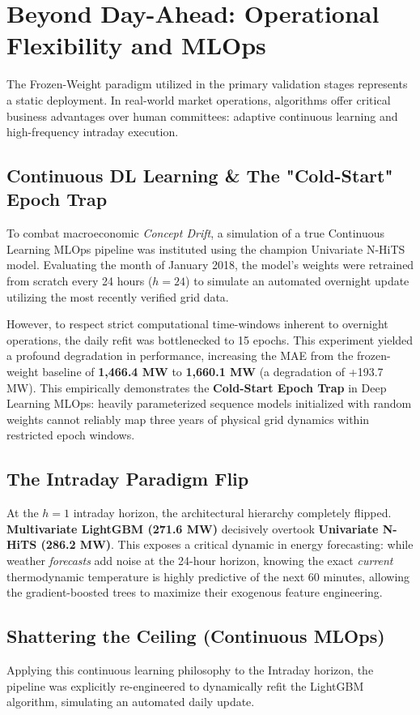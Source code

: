 \documentclass{article}
\begin{document}
\section{Beyond Day-Ahead: Operational Flexibility and MLOps}

The Frozen-Weight paradigm utilized in the primary validation stages represents a static deployment. In real-world market operations, algorithms offer critical business advantages over human committees: adaptive continuous learning and high-frequency intraday execution.

\subsection*{Continuous DL Learning \& The "Cold-Start" Epoch Trap}
To combat macroeconomic \textit{Concept Drift}, a simulation of a true Continuous Learning MLOps pipeline was instituted using the champion Univariate N-HiTS model. Evaluating the month of January 2018, the model's weights were retrained from scratch every 24 hours ($h=24$) to simulate an automated overnight update utilizing the most recently verified grid data. 

However, to respect strict computational time-windows inherent to overnight operations, the daily refit was bottlenecked to 15 epochs. This experiment yielded a profound degradation in performance, increasing the MAE from the frozen-weight baseline of \textbf{1,466.4 MW} to \textbf{1,660.1 MW} (a degradation of +193.7 MW). This empirically demonstrates the \textbf{Cold-Start Epoch Trap} in Deep Learning MLOps: heavily parameterized sequence models initialized with random weights cannot reliably map three years of physical grid dynamics within restricted epoch windows.

\subsection*{The Intraday Paradigm Flip}
At the $h=1$ intraday horizon, the architectural hierarchy completely flipped. \textbf{Multivariate LightGBM (271.6 MW)} decisively overtook \textbf{Univariate N-HiTS (286.2 MW)}. This exposes a critical dynamic in energy forecasting: while weather \textit{forecasts} add noise at the 24-hour horizon, knowing the exact \textit{current} thermodynamic temperature is highly predictive of the next 60 minutes, allowing the gradient-boosted trees to maximize their exogenous feature engineering.

\subsection*{Shattering the Ceiling (Continuous MLOps)}
Applying this continuous learning philosophy to the Intraday horizon, the pipeline was explicitly re-engineered to dynamically refit the LightGBM algorithm, simulating an automated daily update. 
\end{document}
